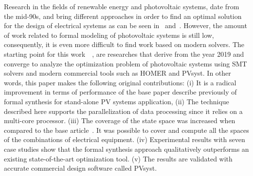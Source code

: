 \documentclass[10pt,journal,compsoc]{IEEEtran}
\begin{document}
Research in the fields of renewable energy and photovoltaic systems, date from the mid-90s, and bring different approaches in order to find an optimal solution for the design of electrical systems as can be seen in~\cite{Driouich2018} and~\cite{Applasamy2011}. However, the amount of work related to formal modeling of photovoltaic systems is still low, consequently, it is even more difficult to find work based on modern solvers. The starting point for this work~\cite{VSTTE2020}~\cite{TrindadeCordeiro19}, are researches that derive from the year 2019 and converge to analyze the optimization problem of photovoltaic systems using SMT solvers and modern commercial tools such as HOMER and PVsyst. In other words, this paper makes the following original contributions: (i) It is a radical improvement in terms of performance of the base paper describe previously of formal synthesis for stand-alone PV systems application, (ii) The technique described here supports the parallelization of data processing since it relies on a multi-core processor. (iii) The coverage of the state space was increased when compared to the base article~\cite{VSTTE2020}. It was possible to cover and compute all the spaces of the combinations of electrical equipment. (iv) Experimental results with seven case studies show that the formal synthesis approach qualitatively outperforms an existing state-of-the-art optimization tool. (v) The results are validated with accurate commercial design software called PVsyst.

\end{document}
